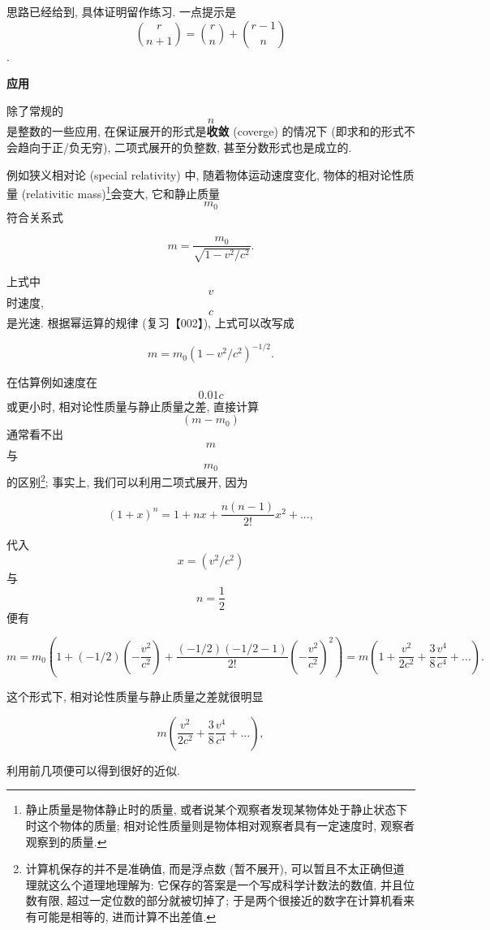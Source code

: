 思路已经给到, 具体证明留作练习. 一点提示是
\[\binom{r}{n+1}=\binom{r}{n}+\binom{r-1}{n}\].

\textbf{应用}

除了常规的 \[n\] 是整数的一些应用, 在保证展开的形式是\textbf{收敛}
(coverge) 的情况下 (即求和的形式不会趋向于正/负无穷),
二项式展开的负整数, 甚至分数形式也是成立的.

例如狭义相对论 (special relativity) 中, 随着物体运动速度变化,
物体的相对论性质量 (relativitic mass)\footnote{静止质量是物体静止时的质量,
  或者说某个观察者发现某物体处于静止状态下时这个物体的质量;
  相对论性质量则是物体相对观察者具有一定速度时, 观察者观察到的质量.}会变大,
它和静止质量 \[m_0\] 符合关系式

\[m=\frac{m_0}{\sqrt{1-v^2/c^2}}.\]

上式中 \[v\] 时速度, \[c\] 是光速. 根据幂运算的规律 (复习【002】),
上式可以改写成

\[m=m_0(1-v^2/c^2)^{-1/2}.\]

在估算例如速度在 \[0.01c\] 或更小时, 相对论性质量与静止质量之差,
直接计算 \[(m-m_0)\] 通常看不出 \[m\] 与 \[m_0\] 的区别\footnote{计算机保存的并不是准确值,
  而是浮点数 (暂不展开), 可以暂且不太正确但道理就这么个道理地理解为:
  它保存的答案是一个写成科学计数法的数值, 并且位数有限,
  超过一定位数的部分就被切掉了;
  于是两个很接近的数字在计算机看来有可能是相等的, 进而计算不出差值.};
事实上, 我们可以利用二项式展开, 因为

\[(1+x)^n=1+nx+\frac{n(n-1)}{2!}x^2+...,\]

代入 \[x=(v^2/c^2)\] 与 \[n=\frac{1}{2}\] 便有

\[m=m_0\left(1+(-1/2)\left(-\frac{v^2}{c^2}\right)+\frac{(-1/2)(-1/2-1)}{2!}\left(-\frac{v^2}{c^2}\right)^2\right)=m\left(1+\frac{v^2}{2c^2}+\frac{3}{8}\frac{v^4}{c^4}+...\right).\]

这个形式下, 相对论性质量与静止质量之差就很明显

\[m\left(\frac{v^2}{2c^2}+\frac{3}{8}\frac{v^4}{c^4}+...\right),\]

利用前几项便可以得到很好的近似.
